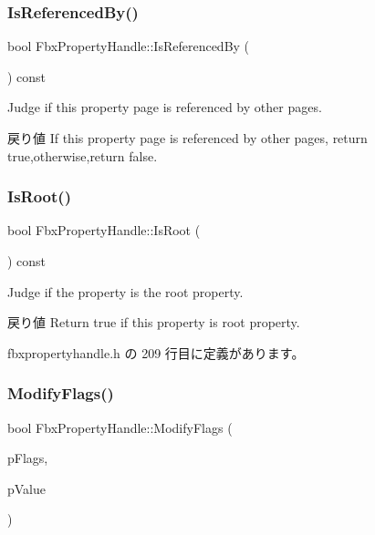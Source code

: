 \subsubsection{\texorpdfstring{Is\+Referenced\+By()}{IsReferencedBy()}}
{\footnotesize\ttfamily bool Fbx\+Property\+Handle\+::\+Is\+Referenced\+By (\begin{DoxyParamCaption}\item[{void}]{ }\end{DoxyParamCaption}) const}

Judge if this property page is referenced by other pages. \begin{DoxyReturn}{戻り値}
If this property page is referenced by other pages, return true,otherwise,return false. 
\end{DoxyReturn}
\mbox{\label{class_fbx_property_handle_ab1da9089aefb10740cdb3aad0754d200}} 
\subsubsection{\texorpdfstring{Is\+Root()}{IsRoot()}}
{\footnotesize\ttfamily bool Fbx\+Property\+Handle\+::\+Is\+Root (\begin{DoxyParamCaption}{ }\end{DoxyParamCaption}) const\hspace{0.3cm}{\ttfamily [inline]}}

Judge if the property is the root property. \begin{DoxyReturn}{戻り値}
Return true if this property is root property. 
\end{DoxyReturn}


 fbxpropertyhandle.\+h の 209 行目に定義があります。

\mbox{\label{class_fbx_property_handle_aa5f4add93321ecbb6afb016bbf9ecc21}} 
\subsubsection{\texorpdfstring{Modify\+Flags()}{ModifyFlags()}}
{\footnotesize\ttfamily bool Fbx\+Property\+Handle\+::\+Modify\+Flags (\begin{DoxyParamCaption}\item[{\hyperlink{class_fbx_property_flags_afabfa7e0949aac8a7dcdf8a141867e99}{Fbx\+Property\+Flags\+::\+E\+Flags}}]{p\+Flags,  }\item[{bool}]{p\+Value }\end{DoxyParamCaption})}

